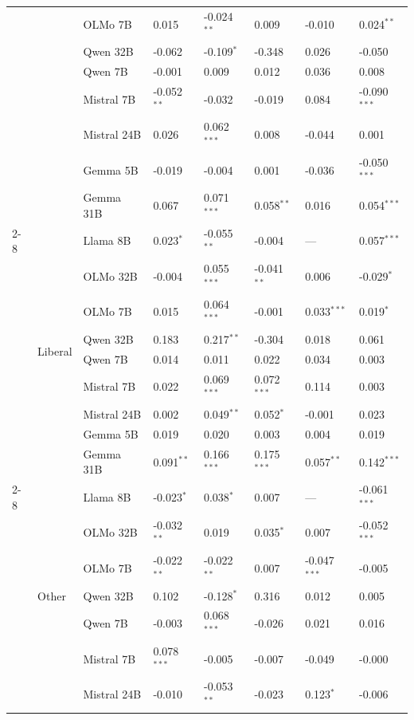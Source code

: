\begin{longtable}[t]{llllllll}
 &  & OLMo 7B & 0.015 & -0.024$^{**}$ & 0.009 & -0.010 & 0.024$^{**}$ \\
 &  & Qwen 32B & -0.062 & -0.109$^{*}$ & -0.348 & 0.026 & -0.050 \\
 &  & Qwen 7B & -0.001 & 0.009 & 0.012 & 0.036 & 0.008 \\
 &  & Mistral 7B & -0.052$^{**}$ & -0.032 & -0.019 & 0.084 & -0.090$^{***}$ \\
 &  & Mistral 24B & 0.026 & 0.062$^{***}$ & 0.008 & -0.044 & 0.001 \\
 &  & Gemma 5B & -0.019 & -0.004 & 0.001 & -0.036 & -0.050$^{***}$ \\
 &  & Gemma 31B & 0.067 & 0.071$^{***}$ & 0.058$^{**}$ & 0.016 & 0.054$^{***}$ \\
\cline{2-8}
 & \multirow[t]{9}{*}{Liberal} & Llama 8B & 0.023$^{*}$ & -0.055$^{**}$ & -0.004 & --- & 0.057$^{***}$ \\
 &  & OLMo 32B & -0.004 & 0.055$^{***}$ & -0.041$^{**}$ & 0.006 & -0.029$^{*}$ \\
 &  & OLMo 7B & 0.015 & 0.064$^{***}$ & -0.001 & 0.033$^{***}$ & 0.019$^{*}$ \\
 &  & Qwen 32B & 0.183 & 0.217$^{**}$ & -0.304 & 0.018 & 0.061 \\
 &  & Qwen 7B & 0.014 & 0.011 & 0.022 & 0.034 & 0.003 \\
 &  & Mistral 7B & 0.022 & 0.069$^{***}$ & 0.072$^{***}$ & 0.114 & 0.003 \\
 &  & Mistral 24B & 0.002 & 0.049$^{**}$ & 0.052$^{*}$ & -0.001 & 0.023 \\
 &  & Gemma 5B & 0.019 & 0.020 & 0.003 & 0.004 & 0.019 \\
 &  & Gemma 31B & 0.091$^{**}$ & 0.166$^{***}$ & 0.175$^{***}$ & 0.057$^{**}$ & 0.142$^{***}$ \\
\cline{2-8}
 & \multirow[t]{9}{*}{Other} & Llama 8B & -0.023$^{*}$ & 0.038$^{*}$ & 0.007 & --- & -0.061$^{***}$ \\
 &  & OLMo 32B & -0.032$^{**}$ & 0.019 & 0.035$^{*}$ & 0.007 & -0.052$^{***}$ \\
 &  & OLMo 7B & -0.022$^{**}$ & -0.022$^{**}$ & 0.007 & -0.047$^{***}$ & -0.005 \\
 &  & Qwen 32B & 0.102 & -0.128$^{*}$ & 0.316 & 0.012 & 0.005 \\
 &  & Qwen 7B & -0.003 & 0.068$^{***}$ & -0.026 & 0.021 & 0.016 \\
 &  & Mistral 7B & 0.078$^{***}$ & -0.005 & -0.007 & -0.049 & -0.000 \\
 &  & Mistral 24B & -0.010 & -0.053$^{**}$ & -0.023 & 0.123$^{*}$ & -0.006 \\

\end{longtable}
